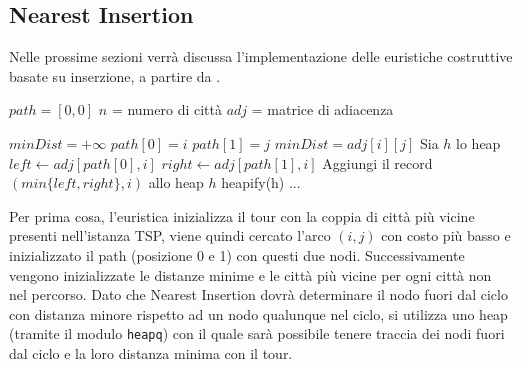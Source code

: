 \documentclass[a4paper,12pt]{report}
\begin{document}
\subsection{Nearest Insertion}
Nelle prossime sezioni verrà discussa l'implementazione delle euristiche costruttive basate su inserzione, a partire da .
\begin{tcolorbox}[colframe=black, colback=white, boxrule=0.5pt, title=Nearest Insertion, coltitle=black, fonttitle=\bfseries, colbacktitle=white, breakable]
  \begin{algorithmic}[1]
    \State $path = [0, 0]$
    \State $n$ = numero di città
    \State $adj$ = matrice di adiacenza

    \State $minDist = +\infty$
          \State \texttt{$path[0] = i$}
          \State \texttt{$path[1] = j$}
          \State \texttt{$minDist = adj[i][j]$}
        \EndIf
      \EndFor
    \EndFor
    \State Sia $h$ lo heap
      \State $left \gets adj[path[0], i]$
      \State $right \gets adj[path[1], i]$
      \State Aggiungi il record $(min\{left, right\}, i)$ allo heap $h$
    \EndFor
    \State heapify(h)
    \State ...
  \end{algorithmic}
\end{tcolorbox}
Per prima cosa, l'euristica inizializza il tour con la coppia di città più vicine presenti nell'istanza TSP, viene quindi cercato l'arco $(i, j)$ con costo più basso e inizializzato il path (posizione 0 e 1) con questi due nodi.
Successivamente vengono inizializzate le distanze minime e le città più vicine per ogni città non nel percorso. Dato che Nearest Insertion dovrà determinare il nodo fuori dal ciclo con distanza minore rispetto ad un nodo qualunque nel ciclo, si utilizza uno heap (tramite il modulo \lstinline!heapq!) con il quale sarà possibile tenere traccia dei nodi fuori dal ciclo e la loro distanza minima con il tour.
\end{document}
